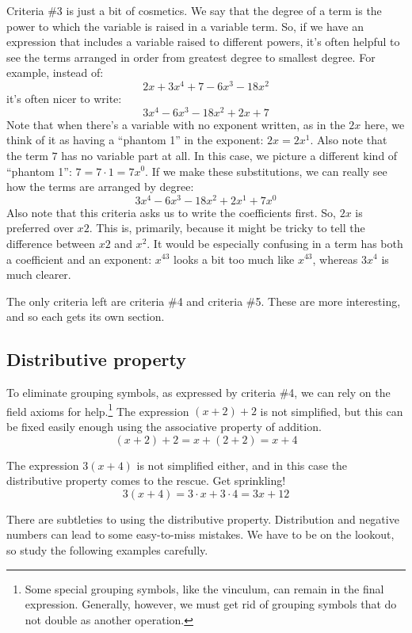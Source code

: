 Criteria \#3 is just a bit of cosmetics. We say that the \gls{degree of a term} is the power to which the variable is raised in a variable term. So, if we have an expression that includes a variable raised to different powers, it's often helpful to see the terms arranged in order from greatest degree to smallest degree. For example, instead of:
\[2x + 3x^4 + 7 - 6x^3 - 18x^2\]
it's often nicer to write:
\[3x^4 - 6x^3 - 18x^2 + 2x + 7\]
Note that when there's a variable with no exponent written, as in the $2x$ here, we think of it as having a ``phantom 1'' in the exponent: $2x = 2x^1$. Also note that the term $7$ has no variable part at all. In this case, we picture a different kind of ``phantom 1'': $7 = 7 \cdot 1 = 7x^0$. If we make these substitutions, we can really see how the terms are arranged by degree:
\[3x^4 - 6x^3 - 18x^2 + 2x^1 + 7x^0\]
Also note that this criteria asks us to write the coefficients first. So, $2x$ is preferred over $x2$. This is, primarily, because it might be tricky to tell the difference between $x2$ and $x^2$. It would be especially confusing in a term has both a coefficient and an exponent: $x^43$ looks a bit too much like $x^{43}$, whereas $3x^4$ is much clearer.

The only criteria left are criteria \#4 and criteria \#5. These are more interesting, and so each gets its own section.

\subsection{Distributive property}

To eliminate grouping symbols, as expressed by criteria \#4, we can rely on the field axioms for help.\footnote{Some special grouping symbols, like the vinculum, can remain in the final expression. Generally, however, we must get rid of grouping symbols that do not double as another operation.} The expression $(x + 2) + 2$ is not simplified, but this can be fixed easily enough using the associative property of addition.
\[(x+2)+2 = x+(2+2) = x+4\]

The expression $3(x + 4)$ is not simplified either, and in this case the distributive property comes to the rescue. Get sprinkling!
\[3(x+4) = 3 \cdot x + 3\cdot 4 = 3x + 12\]

There are subtleties to using the distributive property. Distribution and negative numbers can lead to some easy-to-miss mistakes. We have to be on the lookout, so study the following examples carefully.


